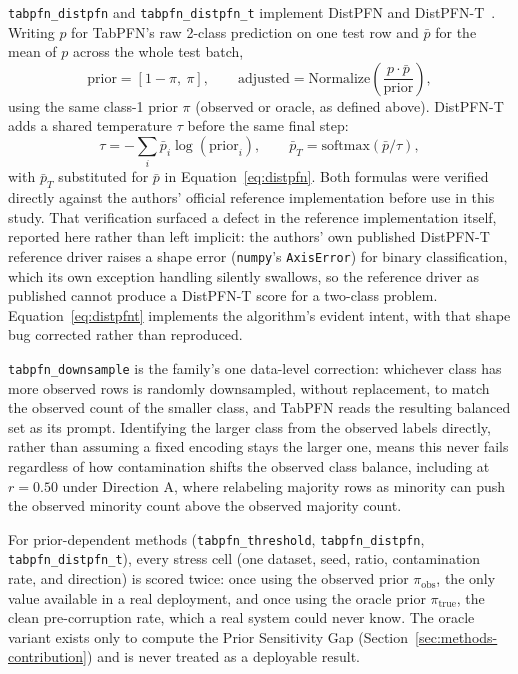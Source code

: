 \texttt{tabpfn\_distpfn} and \texttt{tabpfn\_distpfn\_t} implement
DistPFN and DistPFN-T~\cite{lee2026distpfn}. Writing $p$ for TabPFN's raw
2-class prediction on one test row and $\bar{p}$ for the mean of $p$ across
the whole test batch,
\begin{equation}
\text{prior} = [1-\pi,\ \pi], \qquad
\text{adjusted} = \text{Normalize}\!\left(\frac{p \cdot \bar{p}}{\text{prior}}\right),
\label{eq:distpfn}
\end{equation}
using the same class-1 prior $\pi$ (observed or oracle, as defined above).
DistPFN-T adds a shared temperature
$\tau$ before the same final step:
\begin{equation}
\tau = -\sum_i \bar{p}_i \log(\text{prior}_i), \qquad
\bar{p}_T = \text{softmax}(\bar{p}/\tau),
\label{eq:distpfnt}
\end{equation}
with $\bar{p}_T$ substituted for $\bar{p}$ in Equation~\ref{eq:distpfn}. Both
formulas were verified directly against the authors' official reference
implementation before use in this study. That verification surfaced a
defect in the reference implementation itself, reported here rather than
left implicit: the authors' own published DistPFN-T reference driver
raises a shape error (\texttt{numpy}'s \texttt{AxisError}) for binary
classification, which its own exception handling silently swallows, so the
reference driver as published cannot produce a DistPFN-T score for a
two-class problem. Equation~\ref{eq:distpfnt} implements the algorithm's
evident intent, with that shape bug corrected rather than reproduced.

\texttt{tabpfn\_downsample} is the family's one data-level correction:
whichever class has more observed rows is randomly downsampled, without
replacement, to match the observed count of the smaller class, and TabPFN
reads the resulting balanced set as its prompt. Identifying the larger
class from the observed labels directly, rather than assuming a fixed
encoding stays the larger one, means this never fails regardless of how
contamination shifts the observed class balance, including at $r{=}0.50$
under Direction A, where relabeling majority rows as minority can push
the observed minority count above the observed majority count.

For prior-dependent methods (\texttt{tabpfn\_threshold},
\texttt{tabpfn\_distpfn}, \texttt{tabpfn\_distpfn\_t}), every stress cell
(one dataset, seed, ratio, contamination rate, and direction) is scored
twice: once using the observed prior $\pi_{\text{obs}}$, the only
value available in a real deployment, and once using the oracle prior
$\pi_{\text{true}}$, the clean pre-corruption rate, which a real system could
never know. The oracle variant exists only to compute the Prior Sensitivity
Gap (Section~\ref{sec:methods-contribution}) and is never treated as a
deployable result.

